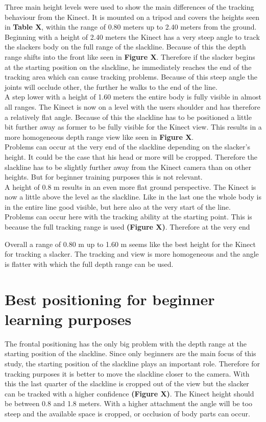 Three main height levels were used to show the main differences of the tracking behaviour from the Kinect. It is mounted on a tripod and covers the heights seen in \textbf{Table X}, within the range of 0.80 meters up to 2.40 meters from the ground.
\\
Beginning with a height of 2.40 meters the Kinect has a very steep angle to track the slackers body on the full range of the slackline. Because of this the depth range shifts into the front like seen in \textbf{Figure X}. Therefore if the slacker begins at the starting position on the slackline, he immediately reaches the end of the tracking area which can cause tracking problems. Because of this steep angle the joints will occlude other, the further he walks to the end of the line.
\\
A step lower with a height of 1.60 meters the entire body is fully visible in almost all ranges. The Kinect is now on a level with the users shoulder and has therefore a relatively flat angle. Because of this the slackline has to be positioned a little bit further away as former to be fully visible for the Kinect view. This results in a more homogeneous depth range view like seen in \textbf{Figure X}.
\\
Problems can occur at the very end of the slackline depending on the slacker’s height. It could be the case that his head or more will be cropped. Therefore the slackline has to be slightly further away from the Kinect camera than on other heights. But for beginner training purposes this is not relevant.
\\
A height of 0.8 m results in an even more flat ground perspective. The Kinect is now a little above the level as the slackline. Like in the last one the whole body is in the entire line good visible, but here also at the very start of the line. Problems can occur here with the tracking ability at the starting point. This is because the full tracking range is used \textbf{(Figure X)}. Therefore at the very end  

Overall a range of 0.80 m up to 1.60 m seems like the best height for the Kinect for tracking a slacker. The tracking and view is more homogeneous and the angle is flatter with which the full depth range can be used.




\section{Best positioning for beginner learning purposes}
The frontal positioning has the only big problem with the depth range at the starting position of the slackline. Since only beginners are the main focus of this study, the starting position of the slackline plays an important role. Therefore for tracking purposes it is better to move the slackline closer to the camera. With this the last quarter of the slackline is cropped out of the view but the slacker can be tracked with a higher confidence \textbf{(Figure X)}. The Kinect height should be between 0.8 and 1.8 meters. With a higher attachment the angle will be too steep and the available space is cropped, or occlusion of body parts can occur.
